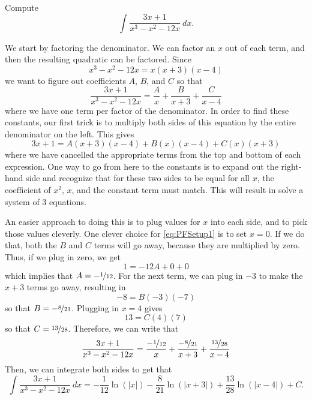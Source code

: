 \documentclass{ximera}
\begin{document}
\begin{example}
    Compute
    \begin{equation*}
        \int \frac{3x + 1}{x^3 - x^2 - 12x}\ dx.
    \end{equation*}
\end{example}

\begin{exampleSol}
    We start by factoring the denominator. We can factor an $x$ out of each term, and then the resulting quadratic can be factored. Since
    \begin{equation*}
        x^3 - x^2 - 12x = x(x+3)(x-4)
    \end{equation*}
    we want to figure out coefficients $A$, $B$, and $C$ so that
    \begin{equation*}
        \frac{3x + 1}{x^3 - x^2 - 12x} = \frac{A}{x} + \frac{B}{x+3} + \frac{C}{x-4} 
    \end{equation*}
    where we have one term per factor of the denominator. In order to find these constants, our first trick is to multiply both sides of this equation by the entire denominator on the left. This gives
    \begin{equation} \label{eq:PFSetup1}
        3x+1 = A(x+3)(x-4) + B(x)(x-4) + C(x)(x+3)
    \end{equation}
    where we have cancelled the appropriate terms from the top and bottom of each expression. One way to go from here to the constants is to expand out the right-hand side and recognize that for these two sides to be equal for all $x$, the coefficient of $x^2$, $x$, and the constant term must match. This will result in solve a system of 3 equations. 
    
    An easier approach to doing this is to plug values for $x$ into each side, and to pick those values cleverly. One clever choice for \eqref{eq:PFSetup1} is to set $x=0$. If we do that, both the $B$ and $C$ terms will go away, because they are multiplied by zero. Thus, if we plug in zero, we get
    \begin{equation*}
        1 = -12A + 0 + 0
    \end{equation*}
    which implies that $A = -\nicefrac{1}{12}$. For the next term, we can plug in $-3$ to make the $x+3$ terms go away, resulting in
    \begin{equation*}
        -8 = B(-3)(-7)
    \end{equation*} so that $B = -\nicefrac{8}{21}$. Plugging in $x=4$ gives
    \begin{equation*}
        13 = C(4)(7)
    \end{equation*}
    so that $C = \nicefrac{13}{28}$. Therefore, we can write that
    \begin{equation*}
        \frac{3x + 1}{x^3 - x^2 - 12x} = \frac{-\nicefrac{1}{12}}{x} + \frac{ -\nicefrac{8}{21}}{x+3} + \frac{\nicefrac{13}{28}}{x-4}
    \end{equation*}
    Then, we can integrate both sides to get that
    \begin{equation*}
        \int \frac{3x + 1}{x^3 - x^2 - 12x}\ dx = -\frac{1}{12}\ln(|x|) - \frac{8}{21}\ln(|x+3|) + \frac{13}{28} \ln(|x-4|) + C.
    \end{equation*}
\end{exampleSol}
\end{document}
